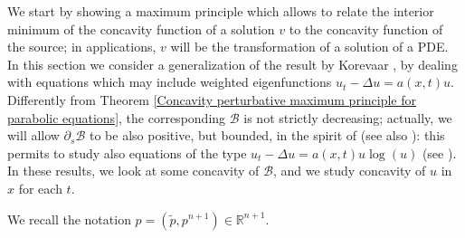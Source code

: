 \documentclass[11pt, reqno]{amsart}
\theoremstyle{definition}
\numberwithin{equation}{section}
\newcommand{\R}{\mathbb{R}}
\begin{document}
We start by showing a maximum principle which allows to relate the interior minimum of the concavity function of a solution $v$ to the concavity function of the source; in applications, $v$ will be the transformation of a solution of a PDE. 
In this section we consider a generalization of the result by Korevaar \cite{Korevaar}, by dealing with equations which may include weighted eigenfunctions $ u_t - \Delta u = a(x,t) u$. Differently from Theorem \ref{Concavity perturbative maximum principle for parabolic equations}, the corresponding $\mathscr{B}$ is not strictly decreasing; actually, we will allow $\partial_s \mathscr{B}$ to be also positive, but bounded, in the spirit of \cite{PorruSerra} (see also \cite{GrecoKawohl}): this permits to study also equations of the type $u_t-\Delta u = a(x,t) u \log(u)$ (see \cite{Gallo-Mosconi-Squassina}). 
In these results, we look at some concavity of $\mathscr{B}$, and we study concavity of $u$ in $x$ for each $t$.

We recall the notation $p=(\tilde{p}, p^{n+1}) \in \R^{n+1}$.
\end{document}
